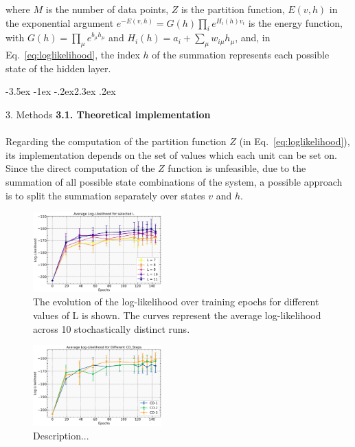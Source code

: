 \documentclass[prl,twocolumn]{revtex4-1}
\makeatletter
\renewcommand{\section}{\@startsection{section}{1}{\z@}%
	{-3.5ex \@plus -1ex \@minus -.2ex}{2.3ex \@plus.2ex}%
	{\normalfont\bfseries\raggedright}}
\makeatother
\begin{document}
where $M$ is the number of data points, $Z$ is the partition function, $E(v,h)$ in the exponential argument $e^{-E(v,h)}=G(h)\prod_{i}{e^{H_i(h)v_i}}$ is the energy function, with $G(h)=\prod_{\mu}{e^{b_{\mu}h_{\mu}}}$ and $H_i(h)=a_i+\sum_{\mu}w_{i\mu}h_\mu$, and, in Eq.~\ref{eq:loglikelihood}, the index $h$ of the summation represents each possible state of the hidden layer.


\section{3. Methods}
\noindent\textbf{3.1. Theoretical implementation}
\\
\\
Regarding the computation of the partition function $Z$ (in Eq.~\ref{eq:loglikelihood}), its implementation depends on the set of values which each unit can be set on. Since the direct computation of the $Z$ function is unfeasible, due to the summation of all possible state combinations of the system, a possible approach is to split the summation separately over states $v$ and $h$.

\begin{figure}[!tb]
	\includegraphics[width=0.44\textwidth]{L_of_epochs.jpg}
	\caption{The evolution of the log-likelihood over training epochs for different values of L is shown. The curves represent the average log-likelihood across 10 stochastically distinct runs.}
	\label{fig:L_of_epochs}
\end{figure}

\begin{figure}[!tb]
	\includegraphics[width=0.44\textwidth]{L_of_CD.png}
	\caption{Description...}
	\label{fig:L_of_CD}
\end{figure}
\end{document}
